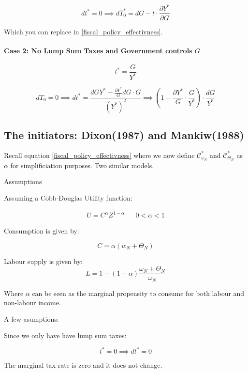 $$
dt^* = 0 \implies dT^*_0 = dG - t \cdot \frac{\partial Y^*}{\partial G}
$$

Which you can replace in \ref{fiscal_policy_effectivness}.

\paragraph{Case 2: No Lump Sum Taxes and Government controls $G$}


$$
t^* = \frac{G}{Y^*}
$$


$$
dT_0 = 0 \implies dt^* = \frac{dGY^* - \frac{\partial Y^*}{G}dG \cdot G}{(Y^*)^2} \implies \left( 1 - \frac{\partial Y^*}{G} \cdot \frac{G}{Y^*} \right) \cdot \frac{dG}{Y^*}
$$





\subsection{The initiators: Dixon(1987) and Mankiw(1988)}

Recall equation \ref{fiscal_policy_effectivness} where we now define $\mathcal{C}^*_{\omega_N}$ and $\mathcal{C}^*_{\Theta_N}$ as $\alpha$ for simplificiation purposes. 
Two similar models. 

Assumptions

Assuming a Cobb-Douglas Utility function:


\begin{align*}
    U = C^\alpha Z^{1-\alpha} && 0 < \alpha < 1
\end{align*}

Consumption is given by:

\begin{equation}\label{consumption}
    C = \alpha \left( w _ { N } + \Theta _ { N } \right)
\end{equation}



Labour supply is given by:
$$
L = 1 - ( 1- \alpha) \frac{\omega_N + \Theta_N}{\omega_N}
$$

Where $\alpha$ can be seen as the marginal propensity to consume for both labour and non-labour income. 


A few asumptions:


Since we only have have lump sum taxes:

$$
t^* = 0 \implies dt^* = 0
$$

The marginal tax rate is zero and it does not change. 

